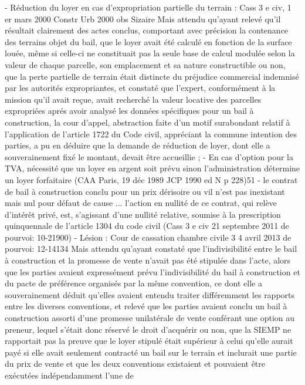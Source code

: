 \documentclass[11pt,a4paper]{report}
\begin{document}
	- Réduction du loyer en cas d’expropriation partielle du terrain : Cass 3 e civ, 1 er mars 2000 Constr Urb 2000
	 obs Sizaire Mais attendu qu'ayant relevé qu'il résultait clairement des actes conclus, comportant avec
	précision la contenance des terrains objet du bail, que le loyer avait été calculé en fonction de la surface louée,
	même si celle-ci ne constituait pas la seule base de calcul modulée selon la valeur de chaque parcelle, son
	emplacement et sa nature constructible ou non, que la perte partielle de terrain était distincte du préjudice
	commercial indemnisé par les autorités expropriantes, et constaté que l'expert, conformément à la mission qu'il
	avait reçue, avait recherché la valeur locative des parcelles expropriées aprés avoir analysé les données
	spécifiques pour un bail à construction, la cour d'appel, abstraction faite d'un motif surabondant relatif à
	l'application de l'article 1722 du Code civil, appréciant la commune intention des parties, a pu en déduire que la
	demande de réduction de loyer, dont elle a souverainement fixé le montant, devait être accueillie ;
	- En cas d’option pour la TVA, nécessité que un loyer en argent soit prévu sinon l’administration
	détermine un loyer forfaitaire (CAA Paris, 19 déc 1989 JCP 1990 ed N p 228)51
	- le contrat de bail à construction conclu pour un prix dérisoire ou vil n'est pas inexistant mais nul pour
	défaut de cause ... l'action en nullité de ce contrat, qui relève d'intérêt privé, est, s'agissant d'une nullité relative,
	soumise à la prescription quinquennale de l'article 1304 du code civil (Cass 3 e civ 21 septembre 2011
	\No  de pourvoi: 10-21900)
	- Lésion : Cour de cassation chambre civile 3 4 avril 2013 \No  de pourvoi: 12-14134
	Mais attendu qu'ayant constaté que l'indivisibilité entre le bail à construction et la promesse de vente n'avait pas
	été stipulée dans l'acte, alors que les parties avaient expressément prévu l'indivisibilité du bail à construction et
	du pacte de préférence organisés par la même convention, ce dont elle a souverainement déduit qu'elles avaient
	entendu traiter différemment les rapports entre les diverses conventions, et relevé que les parties avaient conclu
	un bail à construction assorti d'une promesse unilatérale de vente conférant une option au preneur, lequel s'était
	donc réservé le droit d'acquérir ou non, que la SIEMP ne rapportait pas la preuve que le loyer stipulé était
	supérieur à celui qu'elle aurait payé si elle avait seulement contracté un bail sur le terrain et inclurait une partie
	du prix de vente et que les deux conventions existaient et pouvaient être exécutées indépendamment l'une de
\end{document}

